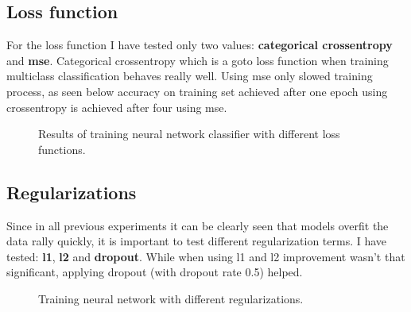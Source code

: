 \documentclass{article}
\begin{document}
\newpage

\subsection{Loss function}
For the loss function I have tested only two values: \textbf{categorical crossentropy} and
\textbf{mse}. Categorical crossentropy which is a goto loss function when training multiclass
classification behaves really well. Using mse only slowed training process, as seen below 
accuracy on training set achieved after one epoch using crossentropy is achieved after four using mse.

\begin{figure}[h]	
	\begin{center}
        \caption{Results of training neural network classifier with different loss functions.}
	\end{center}
\end{figure}


\subsection{Regularizations}
Since in all previous experiments it can be clearly seen that models overfit the data rally quickly,
it is important to test different regularization terms. I have tested: \textbf{l1}, \textbf{l2} and \textbf{dropout}.
While when using l1 and l2 improvement wasn't that significant, applying dropout (with dropout rate 0.5) helped.
\begin{figure}[h]	
	\begin{center}
        \caption{Training neural network with different regularizations.}
	\end{center}
\end{figure}
\end{document}
